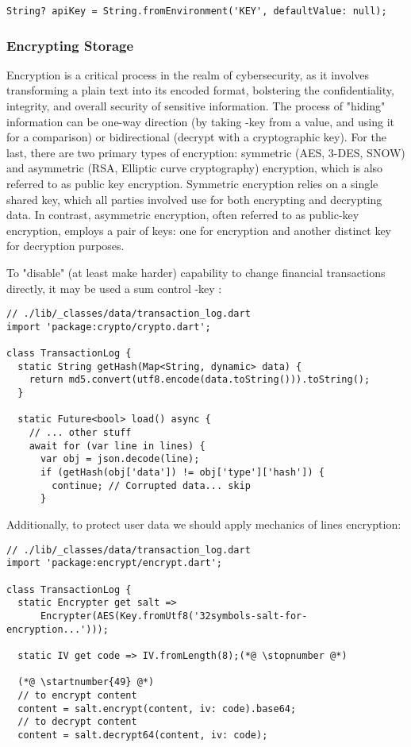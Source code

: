 \begin{lstlisting}
String? apiKey = String.fromEnvironment('KEY', defaultValue: null);
\end{lstlisting}


\subsubsection{Encrypting Storage}

Encryption is a critical process in the realm of cybersecurity, as it involves transforming a plain text into its 
encoded format, bolstering the confidentiality, integrity, and overall security of sensitive information. The process 
of "hiding" information can be one-way direction (by taking -key from a value, and using it for a comparison) 
or bidirectional (decrypt with a cryptographic key). For the last, there are two primary types of encryption: symmetric 
(AES, 3-DES, SNOW) and asymmetric (RSA, Elliptic curve cryptography) encryption, which is also referred to as public 
key encryption. Symmetric encryption relies on a single shared key, which all parties involved use for both encrypting 
and decrypting data. In contrast, asymmetric encryption, often referred to as public-key encryption, employs a pair of 
keys: one for encryption and another distinct key for decryption purposes.

To "disable" (at least make harder) capability to change financial transactions directly, it may be used a sum control 
-key :

\begin{lstlisting}
// ./lib/_classes/data/transaction_log.dart
import 'package:crypto/crypto.dart';

class TransactionLog {
  static String getHash(Map<String, dynamic> data) {
    return md5.convert(utf8.encode(data.toString())).toString();
  }

  static Future<bool> load() async {
    // ... other stuff
    await for (var line in lines) {
      var obj = json.decode(line);
      if (getHash(obj['data']) != obj['type']['hash']) {
        continue; // Corrupted data... skip
      }
\end{lstlisting}

\noindent Additionally, to protect user data we should apply mechanics of lines encryption:

\begin{lstlisting}
// ./lib/_classes/data/transaction_log.dart
import 'package:encrypt/encrypt.dart';

class TransactionLog {
  static Encrypter get salt =>
      Encrypter(AES(Key.fromUtf8('32symbols-salt-for-encryption...')));

  static IV get code => IV.fromLength(8);(*@ \stopnumber @*)

  (*@ \startnumber{49} @*)
  // to encrypt content
  content = salt.encrypt(content, iv: code).base64;
  // to decrypt content
  content = salt.decrypt64(content, iv: code);
\end{lstlisting}

